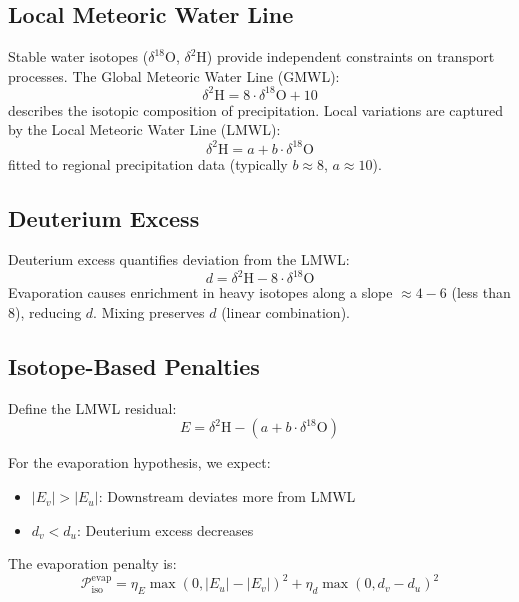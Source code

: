 \documentclass[12pt,a4paper]{article}
\theoremstyle{plain}
\theoremstyle{definition}
\theoremstyle{remark}
\begin{document}
\subsection{Local Meteoric Water Line}

Stable water isotopes ($\delta^{18}$O, $\delta^2$H) provide independent constraints on transport processes. The Global Meteoric Water Line (GMWL):
\begin{equation}
	\delta^2\text{H} = 8 \cdot \delta^{18}\text{O} + 10
\end{equation}
describes the isotopic composition of precipitation. Local variations are captured by the Local Meteoric Water Line (LMWL):
\begin{equation}\label{eq:lmwl}
	\delta^2\text{H} = a + b \cdot \delta^{18}\text{O}
\end{equation}
fitted to regional precipitation data (typically $b \approx 8$, $a \approx 10$).

\subsection{Deuterium Excess}

Deuterium excess quantifies deviation from the LMWL:
\begin{equation}\label{eq:d_excess}
	d = \delta^2\text{H} - 8 \cdot \delta^{18}\text{O}
\end{equation}
Evaporation causes enrichment in heavy isotopes along a slope $\approx 4-6$ (less than 8), reducing $d$. Mixing preserves $d$ (linear combination).

\subsection{Isotope-Based Penalties}

Define the LMWL residual:
\begin{equation}
	E = \delta^2\text{H} - (a + b \cdot \delta^{18}\text{O})
\end{equation}

For the evaporation hypothesis, we expect:
\begin{itemize}
	\item $|E_v| > |E_u|$: Downstream deviates more from LMWL
	\item $d_v < d_u$: Deuterium excess decreases
\end{itemize}

The evaporation penalty is:
\begin{equation}\label{eq:iso_penalty_evap}
	\mathcal{P}_{\text{iso}}^{\text{evap}} = \eta_E \max(0, |E_u| - |E_v|)^2 + \eta_d \max(0, d_v - d_u)^2
\end{equation}
\end{document}
